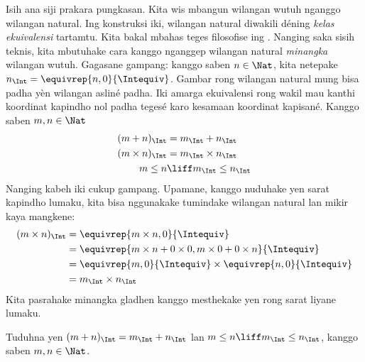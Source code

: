 \documentclass[../../../include/open-logic-section]{subfiles}
\begin{document}
Isih ana siji prakara pungkasan. Kita wis mbangun wilangan wutuh nganggo
wilangan natural. Ing konstruksi iki, wilangan natural diwakili déning \emph{kelas
ekuivalensi} tartamtu. Kita bakal mbahas teges filosofise
ing . Nanging saka sisih teknis, kita mbutuhake cara
kanggo nganggep wilangan natural \emph{minangka} wilangan wutuh.
Gagasane gampang: kanggo saben $n \in \Nat$, kita netepake
$n_\Int = \equivrep{n, 0}{\Intequiv}$. Gambar rong wilangan natural mung bisa padha yèn wilangan asliné padha.
Iki amarga ekuivalensi rong wakil mau kanthi koordinat kapindho nol
padha tegesé karo kesamaan koordinat kapisané. Kanggo saben $m, n
\in \Nat$
\begin{align*}
	(m + n)_\Int &= m_\Int + n_\Int\\
	(m \times n)_\Int &= m_\Int \times n_\Int\\
	m \leq n &\liff m_\Int \leq n_\Int
\end{align*}
Nanging kabeh iki cukup gampang. Upamane, kanggo nuduhake yen
sarat kapindho lumaku, kita bisa nggunakake tumindake wilangan natural
lan mikir kaya mangkene:
	\begin{align*}
		(m \times n)_\Int  &= \equivrep{m \times n, 0}{\Intequiv} \\
		&= \equivrep{m \times n + 0 \times 0, m \times 0 + 0 \times n}{\Intequiv} \\
		&= \equivrep{m, 0}{\Intequiv} \times \equivrep{n, 0}{\Intequiv} \\
		&= m_\Int \times n_\Int
	\end{align*}
Kita pasrahake minangka gladhen kanggo mesthekake yen rong sarat liyane lumaku.
\begin{prob}
	Tuduhna yen $(m + n)_\Int = m_\Int + n_\Int$ lan $m \leq n \liff m_\Int \leq n_\Int$, kanggo saben $m, n \in \Nat$.
\end{prob}
\end{document}
